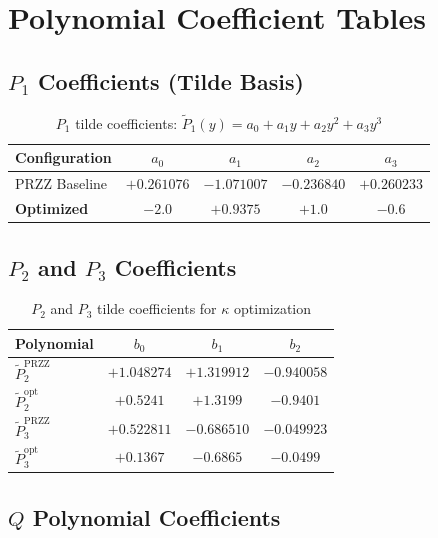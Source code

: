 \documentclass[11pt]{article}
\begin{document}
\section{Polynomial Coefficient Tables}
\label{app:coeffs}

\subsection{$P_1$ Coefficients (Tilde Basis)}

\begin{table}[h]
\centering
\caption{$P_1$ tilde coefficients: $\tilde{P}_1(y) = a_0 + a_1 y + a_2 y^2 + a_3 y^3$}
\begin{tabular}{lcccc}
\toprule
Configuration & $a_0$ & $a_1$ & $a_2$ & $a_3$ \\
\midrule
PRZZ Baseline & $+0.261076$ & $-1.071007$ & $-0.236840$ & $+0.260233$ \\
\textbf{Optimized} & $\mathbf{-2.0}$ & $\mathbf{+0.9375}$ & $\mathbf{+1.0}$ & $\mathbf{-0.6}$ \\
\bottomrule
\end{tabular}
\end{table}

\subsection{$P_2$ and $P_3$ Coefficients}

\begin{table}[h]
\centering
\caption{$P_2$ and $P_3$ tilde coefficients for $\kappa$ optimization}
\begin{tabular}{lccc}
\toprule
Polynomial & $b_0$ & $b_1$ & $b_2$ \\
\midrule
$\tilde{P}_2^{\text{PRZZ}}$ & $+1.048274$ & $+1.319912$ & $-0.940058$ \\
$\tilde{P}_2^{\text{opt}}$ & $+0.5241$ & $+1.3199$ & $-0.9401$ \\
\midrule
$\tilde{P}_3^{\text{PRZZ}}$ & $+0.522811$ & $-0.686510$ & $-0.049923$ \\
$\tilde{P}_3^{\text{opt}}$ & $+0.1367$ & $-0.6865$ & $-0.0499$ \\
\bottomrule
\end{tabular}
\end{table}

\subsection{$Q$ Polynomial Coefficients}
\end{document}
